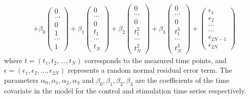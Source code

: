 \begin{eqnarray}
%
&+ \beta_0 
\begin{pmatrix}
0\\
\cdots\\
0\\
1\\
\cdots\\
1
\end{pmatrix}
%
+ \beta_1
\begin{pmatrix}
0\\
\cdots\\
0\\
t_1\\
\cdots\\
t_N
\end{pmatrix}
%
+ \beta_2
\begin{pmatrix}
0\\
\cdots\\
0\\
t_1^2\\
\cdots\\
t_N^2
\end{pmatrix}
%
+ \beta_3
\begin{pmatrix}
0\\
\cdots\\
0\\
t_1^3\\
\cdots\\
t_N^3
\end{pmatrix}
%
+ 
\begin{pmatrix}
\epsilon_1\\
\epsilon_2\\
\cdots\\
\cdots\\
\epsilon_{2N-1}\\
\epsilon_{2N}
\end{pmatrix}
\end{eqnarray}
where $t=(t_1,t_2,\dotsc,t_N)$ corresponds to the measured time points, and
$\epsilon = (\epsilon_1,\epsilon_2,\dotsc,\epsilon_{2N})$ represents a random
normal residual error term. The parameters $\alpha_0,\alpha_1,\alpha_2,
\alpha_3$ and $\beta_0,\beta_1,\beta_2,\beta_3$ are the coefficients of the 
time covariate in the model for the control and stimulation time series 
respectively.

